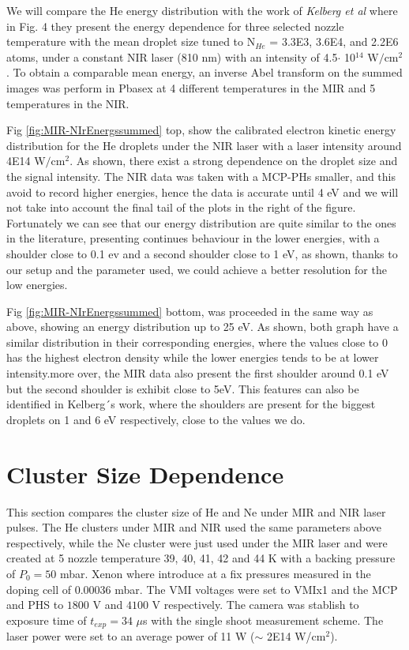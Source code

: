 We will compare the He energy distribution with the work of \textit{Kelberg et al}\cite{kelbg_auger_2019} where in Fig. 4 they present the energy dependence for three selected nozzle temperature with the mean droplet size  tuned to N$_{He}$ = 3.3E3, 3.6E4, and 2.2E6 atoms, under a constant NIR laser (810 nm) with an intensity of 4.5$\cdot$ 10$^{14}$ W$/$cm$^{2}$. To obtain a comparable mean energy, an inverse Abel transform on the summed images was perform in Pbasex  at 4 different temperatures in the MIR and 5 temperatures in the NIR.

Fig \ref{fig:MIR-NIrEnergssummed} top, show the calibrated electron kinetic energy distribution for the He droplets under the NIR laser with a laser intensity around 4E14 W$/$cm$^{2}$.  As shown, there exist a strong dependence on the droplet size and the signal intensity. The NIR data was taken with a MCP-PHs smaller, and this avoid to record higher energies, hence the data is accurate until 4 eV and we will not take into account the final tail of the plots in the right of the figure. Fortunately we can see that our energy distribution are quite similar to the ones in the literature, presenting continues behaviour in the lower energies, with a shoulder close to 0.1 ev and a second shoulder  close to 1 eV, as shown, thanks to our setup and the parameter used, we could achieve a better resolution for the low energies.

Fig \ref{fig:MIR-NIrEnergssummed}  bottom, was proceeded in the same way as above, showing an energy distribution up to 25 eV. As shown, both graph have a similar distribution in their corresponding energies, where the values close to 0 has the highest electron density while the lower energies tends to be at lower intensity.more over, the MIR data also present the first shoulder around 0.1 eV but the second shoulder is exhibit close to 5eV. This features can also be identified in Kelberg´s work, where the shoulders are present for the biggest droplets on 1 and 6 eV respectively, close to the values we do.

\section{Cluster Size Dependence}

This section compares the cluster size of He and Ne under MIR and NIR laser pulses. The He clusters under MIR and NIR used the same parameters above respectively, while the Ne cluster were just used under the MIR laser and were created at 5 nozzle temperature 39, 40, 41, 42 and 44 K with a backing pressure of $P_{0}=50$ mbar. Xenon where introduce at a fix  pressures measured in the doping cell of 0.00036 mbar. The VMI voltages  were set to VMIx1  and the MCP and PHS to $1800$ V and $4100$ V respectively. The camera was stablish to exposure time of $t_{exp}=34$ $\mu$s   with the single shoot measurement scheme. The laser power were set to an average power of 11 W ($\sim$ 2E14 W/cm$^{2}$).

